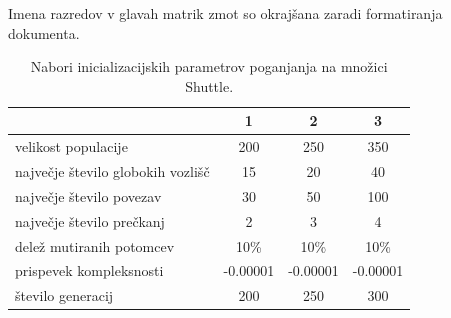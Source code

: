 Imena razredov v glavah matrik zmot so okrajšana zaradi formatiranja dokumenta.
\begin{table}[H]
    \begin{center}
        \begin{tabular}{||l c c c||}
            \hline
            & 1        & 2        & 3 \\ [0.5ex]
            \hline
            velikost populacije               & 200      & 250      & 350      \\
            \hline
            največje število globokih vozlišč & 15       & 20       & 40       \\
            \hline
            največje število povezav          & 30       & 50       & 100      \\
            \hline
            največje število prečkanj         & 2        & 3        & 4        \\
            \hline
            delež mutiranih potomcev          & 10\%     & 10\%     & 10\%     \\
            \hline
            prispevek kompleksnosti           & -0.00001 & -0.00001 & -0.00001 \\
            \hline
            število generacij                 & 200      & 250      & 300      \\
            \hline
        \end{tabular}
    \end{center}
    \caption{Nabori inicializacijskih parametrov poganjanja na množici Shuttle.}
    \label{tab:param_statlog}
\end{table}

